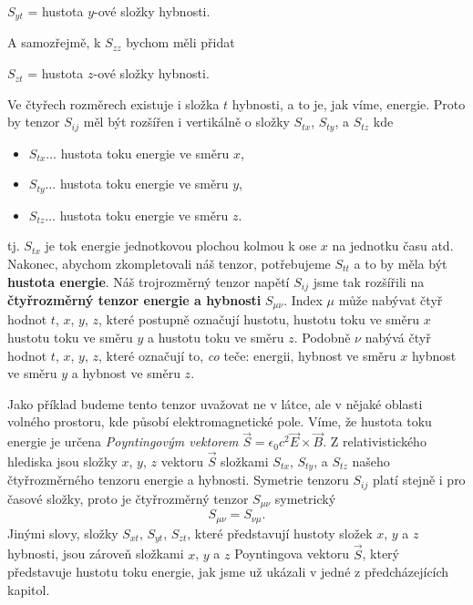 {    \begin{center}
      \(S_{yt}\) = hustota \(y\)-ové složky hybnosti.
    \end{center}

    A samozřejmě, k \(S_{zz}\) bychom měli přidat
    \begin{center}
      \(S_{zt}\) = hustota \(z\)-ové složky hybnosti.
    \end{center}
    
    Ve čtyřech rozměrech existuje i složka \(t\) hybnosti, a to je, jak víme, energie. Proto by
    tenzor \(S_{ij}\) měl být rozšířen i vertikálně o složky \(S_{tx}\), \(S_{ty}\), a \(S_{tz}\)
    kde
    \begin{itemize}[noitemsep]
      \item \(S_{tx}\ldots\) hustota toku energie ve směru \(x\),
      \item \(S_{ty}\ldots\) hustota toku energie ve směru \(y\),
      \item \(S_{tz}\ldots\) hustota toku energie ve směru \(z\).
    \end{itemize}
    tj. \(S_{tx}\) je tok energie jednotkovou plochou kolmou k ose \(x\) na jednotku času atd.
    Nakonec, abychom zkompletovali náš tenzor, potřebujeme \(S_{tt}\) a to by měla být
    \textbf{hustota energie}. Náš trojrozměrný tenzor napětí \(S_{ij}\) jsme tak rozšířili na
    \textbf{čtyřrozměrný tenzor energie a hybnosti} \(S_{\mu\nu}\). Index \(\mu\) může nabývat čtyř
    hodnot \(t\), \(x\), \(y\), \(z\), které postupně označují hustotu, hustotu toku ve směru \(x\)
    hustotu toku ve směru \(y\) a hustotu toku ve směru \(z\). Podobně \(\nu\) nabývá čtyř hodnot
    \(t\), \(x\), \(y\), \(z\), které označují to, \emph{co} teče: energii, hybnost ve směru \(x\)
    hybnost ve směru \(y\) a hybnost ve směru \(z\).
    
    Jako příklad budeme tento tenzor uvažovat ne v látce, ale v nějaké oblasti volného prostoru, kde
    působí elektromagnetické pole. Víme, že hustota toku energie je určena \emph{Poyntingovým
    vektorem} \(\vec{S}=\epsilon_0c^2\vec{E}\times\vec{B}\). Z relativistického hlediska jsou složky
    \(x\), \(y\), \(z\) vektoru \(\vec{S}\) složkami \(S_{tx}\), \(S_{ty}\), a \(S_{tz}\) našeho
    čtyřrozměrného tenzoru energie a hybnosti. Symetrie tenzoru \(S_{ij}\) platí stejně i pro časové
    složky, proto je čtyřrozměrný tenzor \(S_{\mu\nu}\) symetrický
    \begin{equation}\label{fyz:eq956}
      S_{\mu\nu}=S_{\nu\mu}.
    \end{equation}
    Jinými slovy, složky \(S_{xt}\), \(S_{yt}\), \(S_{zt}\), které představují hustoty složek \(x\),
    \(y\) a \(z\) hybnosti, jsou zároveň složkami \(x\), \(y\) a \(z\) Poyntingova vektoru
    \(\vec{S}\), který představuje hustotu toku energie, jak jsme už ukázali v jedné z
    předcházejících kapitol.
    
}
